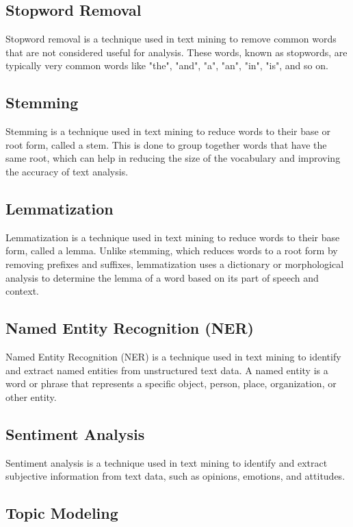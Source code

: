 \documentclass{article}
\begin{document}
\subsection{Stopword Removal}

Stopword removal is a technique used in text mining to remove common words that are not considered useful for analysis. These words, known as stopwords, are typically very common words like "the", "and", "a", "an", "in", "is", and so on.

\subsection{Stemming}

Stemming is a technique used in text mining to reduce words to their base or root form, called a stem. This is done to group together words that have the same root, which can help in reducing the size of the vocabulary and improving the accuracy of text analysis.

\subsection{Lemmatization}

Lemmatization is a technique used in text mining to reduce words to their base form, called a lemma. Unlike stemming, which reduces words to a root form by removing prefixes and suffixes, lemmatization uses a dictionary or morphological analysis to determine the lemma of a word based on its part of speech and context.

\subsection{Named Entity Recognition (NER)}

Named Entity Recognition (NER) is a technique used in text mining to identify and extract named entities from unstructured text data. A named entity is a word or phrase that represents a specific object, person, place, organization, or other entity.

\subsection{Sentiment Analysis}

Sentiment analysis is a technique used in text mining to identify and extract subjective information from text data, such as opinions, emotions, and attitudes.

\subsection{Topic Modeling}
\end{document}
